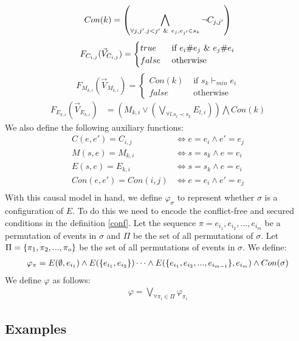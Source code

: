 \begin{align*}
    Con(k) & =   \left(
    \bigwedge_{\forall j,j'. j<j' \ \& \  e_j,e_{j'} \in s_k}
    \neg C_{j,j'}
    \right)             \\
\end{align*}
$$
    F_{C_{i,j}}(\vec V_{C_{i,j}}) = \begin{cases}
        true  & \text{ if } e_i \# e_j \ \& \  e_j \# e_i \\
        false & \text{ otherwise }
    \end{cases}
$$
$$
    F_{M_{k,i}}(\vec V_{M_{k,i}}) = \begin{cases}
        Con(k) & \text{ if } s_k \vdash_{min} e_i \\
        false  & \text{ otherwise }
    \end{cases}
$$
\begin{align*}
    F_{E_{k,i}}(\vec V_{E_{k,i}}) & =
    \left(
    M_{k,i} \vee
    \left(
    \bigvee_{\forall l. s_l  \prec s_k}E_{l,i}
    \right)
    \right)
    \bigwedge
    Con(k)
\end{align*}
We also define the following auxiliary functions:
\begin{align*}
    C(e,e') = C_{i,j}    & \iff e = e_i \wedge e' = e_j \\
    M(s,e)  = M_{k,i}    & \iff s = s_k \wedge e = e_i  \\
    E(s,e)  = E_{k,i}    & \iff s = s_k \wedge e = e_i  \\
    Con(e,e') = Con(i,j) & \iff e = e_i \wedge e' = e_j \\
\end{align*}
With this causal model in hand, we define $\varphi_{\sigma}$ to represent whether $\sigma$ is a configuration of $E$.
To do this we need to encode the conflict-free and secured conditions in the definition \ref{conf}.
Let the sequence $\pi = e_{i_1},e_{i_2},...,e_{i_m}$ be a
permutation of events in $\sigma$ and $\Pi$ be the set of
all permutations of $\sigma$.
Let $\Pi = \{\pi_1,\pi_2,...,\pi_o\}$ be the set of
all permutations of events in $\sigma$.
We define:
\begin{align*}
    \varphi_{\pi} = E(\emptyset,e_{i_1}) \wedge
    E(\{e_{i_1},e_{i_2}\}) \dots
    \wedge E(\{e_{i_1},e_{i_2},...,e_{i_{m-1}}\},e_{i_m}) \wedge Con(\sigma)
\end{align*}
We define $\varphi$ as follows:
\begin{align*}
    \varphi = \bigvee_{\forall \pi_i \in \Pi}\varphi_{\pi_i}
\end{align*}
\pagebreak
\subsection{Examples}
